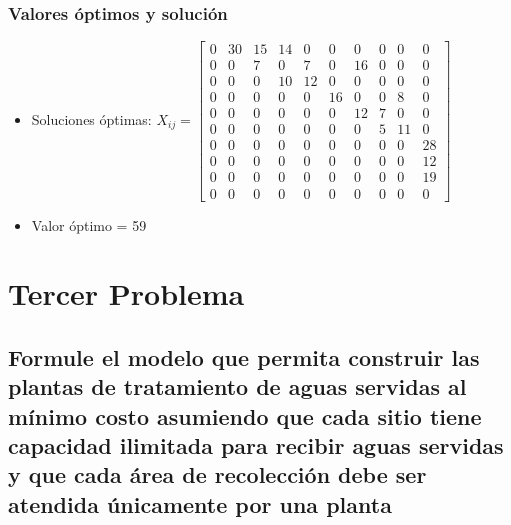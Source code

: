 \documentclass[a4paper,12pt]{article}
\begin{document}
\subsubsection{Valores óptimos y solución}
\begin{itemize}
	\item Soluciones óptimas: $X_{ij}=
	\begin{bmatrix}
		0 & 30 & 15 & 14 & 0 & 0 & 0 & 0 & 0 & 0\\
		0 & 0 & 7 & 0 & 7 & 0 & 16 & 0 & 0 & 0\\
		0 & 0 & 0 & 10 & 12 & 0 & 0 & 0 & 0 & 0\\
		0 & 0 & 0 & 0 & 0 & 16 & 0 & 0 & 8 & 0\\
		0 & 0 & 0 & 0 & 0 & 0 & 12 & 7 & 0 & 0\\
		0 & 0 & 0 & 0 & 0 & 0 & 0 & 5 & 11 & 0\\
		0 & 0 & 0 & 0 & 0 & 0 & 0 & 0 & 0 & 28\\
		0 & 0 & 0 & 0 & 0 & 0 & 0 & 0 & 0 & 12\\
		0 & 0 & 0 & 0 & 0 & 0 & 0 & 0 & 0 & 19\\
		0 & 0 & 0 & 0 & 0 & 0 & 0 & 0 & 0 & 0
	\end{bmatrix}$
	\item Valor óptimo = 59
\end{itemize}
\section{Tercer Problema}
\subsection{Formule  el  modelo  que  permita  construir  las  plantas de  tratamiento  de  aguas  servidas  al  mínimo  costo  asumiendo  que  cada  sitio  tiene  capacidad  ilimitada para  recibir  aguas  servidas  y  que  cada  área  de  recolección debe ser atendida únicamente por una planta}
\end{document}
